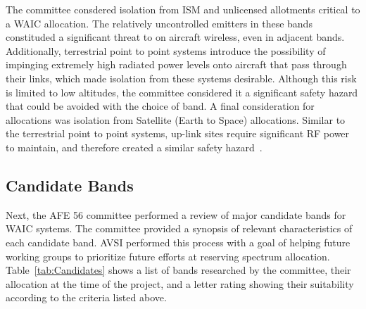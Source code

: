 The committee consdered isolation from ISM and unlicensed allotments critical to a WAIC allocation. The relatively uncontrolled emitters in these bands constituded a significant threat to on aircraft wireless, even in adjacent bands. Additionally, terrestrial point to point systems introduce the possibility of impinging extremely high radiated power levels onto aircraft that pass through their links, which made isolation from these systems desirable. Although this risk is limited to low altitudes, the committee considered it a significant safety hazard that could be avoided with the choice of band. A final consideration for allocations was isolation from Satellite (Earth to Space) allocations. Similar to the terrestrial point to point systems, up-link sites require significant RF power to maintain, and therefore created a similar safety hazard~\cite{ferrell_feasibility_2007}. 

\subsection{Candidate Bands}
Next, the AFE 56 committee performed a review of major candidate bands for WAIC systems. The committee provided a synopsis of relevant characteristics of each candidate band. AVSI performed this process with a goal of helping future working groups to prioritize future efforts at reserving spectrum allocation. Table~\ref{tab:Candidates} shows a list of bands researched by the committee, their allocation at the time of the project, and a letter rating showing their suitability according to the criteria listed above. 

